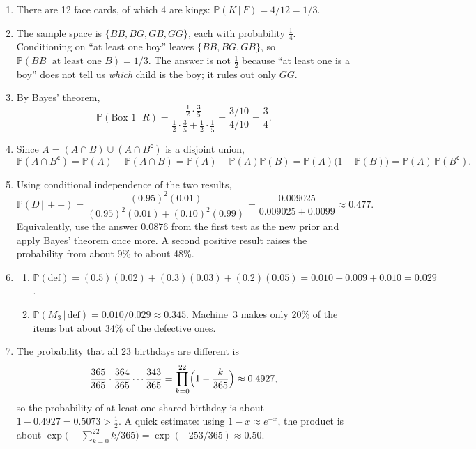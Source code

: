 \documentclass[11pt,letterpaper]{article}
\theoremstyle{definition}
\theoremstyle{plain}
\newcommand{\Prob}{\mathbb{P}}
\newcommand{\given}{\,\vert\,}
\newcommand{\comp}{^{\mathsf{c}}}
\begin{document}
\begin{enumerate}[label=\textbf{\arabic*.}, leftmargin=*, itemsep=6pt]
  \item There are 12 face cards, of which 4 are kings: $\Prob(K \given F) = 4/12 = 1/3$.

  \item The sample space is $\{BB, BG, GB, GG\}$, each with probability $\frac14$. Conditioning on ``at least one boy'' leaves $\{BB, BG, GB\}$, so $\Prob(BB \given \text{at least one } B) = 1/3$. The answer is not $\frac12$ because ``at least one is a boy'' does not tell us \emph{which} child is the boy; it rules out only $GG$.

  \item By Bayes' theorem,
  \[
    \Prob(\text{Box 1} \given R) = \frac{\frac12 \cdot \frac35}{\frac12\cdot\frac35 + \frac12\cdot\frac15} = \frac{3/10}{4/10} = \frac34.
  \]

  \item Since $A = (A \cap B) \cup (A \cap B\comp)$ is a disjoint union,
  \[
    \Prob(A \cap B\comp) = \Prob(A) - \Prob(A \cap B) = \Prob(A) - \Prob(A)\Prob(B) = \Prob(A)\bigl(1 - \Prob(B)\bigr) = \Prob(A)\,\Prob(B\comp).
  \]

  \item Using conditional independence of the two results,
  \[
    \Prob(D \given {+}{+}) = \frac{(0.95)^2(0.01)}{(0.95)^2(0.01) + (0.10)^2(0.99)} = \frac{0.009025}{0.009025 + 0.0099} \approx 0.477.
  \]
  Equivalently, use the answer $0.0876$ from the first test as the new prior and apply Bayes' theorem once more. A second positive result raises the probability from about 9\% to about 48\%.

  \item
  \begin{enumerate}[label=(\alph*), nosep]
    \item $\Prob(\text{def}) = (0.5)(0.02) + (0.3)(0.03) + (0.2)(0.05) = 0.010 + 0.009 + 0.010 = 0.029$.
    \item $\Prob(M_3 \given \text{def}) = 0.010/0.029 \approx 0.345$. Machine~3 makes only 20\% of the items but about 34\% of the defective ones.
  \end{enumerate}

  \item The probability that all 23 birthdays are different is
  \[
    \frac{365}{365}\cdot\frac{364}{365}\cdots\frac{343}{365} = \prod_{k=0}^{22}\Bigl(1 - \frac{k}{365}\Bigr) \approx 0.4927,
  \]
  so the probability of at least one shared birthday is about $1 - 0.4927 = 0.5073 > \frac12$. A quick estimate: using $1 - x \approx e^{-x}$, the product is about $\exp\bigl(-\sum_{k=0}^{22} k/365\bigr) = \exp(-253/365) \approx 0.50$.
\end{enumerate}
\end{document}
